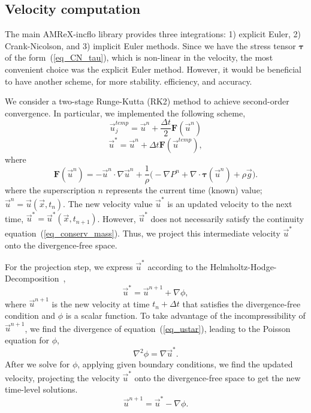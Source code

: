 \subsection{Velocity computation}
The main AMReX-incflo library provides three integrations: 1) explicit Euler, 2) Crank-Nicolson, and 3) implicit Euler methods. 
Since we have the stress tensor ${\bm \tau}$ of the form~(\ref{eq_CN_tau}), which is non-linear in the velocity, the most convenient choice was the explicit Euler method.
 However, it would be beneficial to have another scheme, for more stability. efficiency, and accuracy. 
 \par
 We consider a two-stage Runge-Kutta (RK2) method to achieve second-order convergence. 
In particular, we implemented the following scheme,
\begin{equation}
	\vec{u}_{j}^{temp} = \vec{u}^{n} + \frac{\Delta t}{2} {\bm F} \left( \vec{u}^{n} \right)
	\label{eq_RK2_s1} 
\end{equation}
\begin{equation}
	\vec{u}^{*} = \vec{u}^{n} + \Delta t {\bm F} \left( \vec{u}^{temp} \right),
	\label{eq_RK2_s2}
\end{equation}
where 
\[
  {\bm F} \left( \vec{u}^{n} \right)= 
    -\vec{u}^n \cdot \nabla \vec{u}^n 
    +\frac{1}{\rho}
    \biggl(
    - \nabla P^n 
        + \nabla \cdot   \bm{\tau}(\vec{u}^n)
        +  \rho  \vec{g} 
        \biggr).
\]
where the superscription $n$ represents the current time (known) value; $\vec{u}^n = \vec{u}(\vec{x}, t_n)$. The new velocity value $\vec{u}^*$ is an updated velocity to the next time, $\vec{u}^*  = \vec{u}^* (\vec{x}, t_{n+1})$. However, $\vec{u}^*$ does not necessarily satisfy the continuity equation~(\ref{eq_conserv_mass}). Thus, we project this intermediate velocity $\vec{u}^*$ onto the divergence-free space. 
\par
For the projection step, we express $\vec{u}^{*}$ according to the Helmholtz-Hodge-Decomposition~\cite{chorin_mathematical_1993}, 
\begin{equation}
  \vec{u}^* = \vec{u}^{n+1} + \nabla \phi,
  \label{eq_ustar}
\end{equation}
where $\vec{u}^{n+1}$ is the new velocity at time $t_n + \Delta t$ that satisfies the divergence-free condition and $\phi$ is a scalar function.
To take advantage of the incompressibility of $\vec{u}^{n+1}$, we find the divergence of equation~(\ref{eq_ustar}), leading to the Poisson equation for $\phi$,
\[
  \nabla^2 \phi = \nabla \vec{u}^*.  
\]
After we solve for $\phi$, applying given boundary conditions, we find the updated velocity, projecting the velocity $\vec{u}^*$ onto the divergence-free space to get the new time-level solutions.
\[
  \vec{u}^{n+1} = \vec{u}^* - \nabla \phi.
\]

